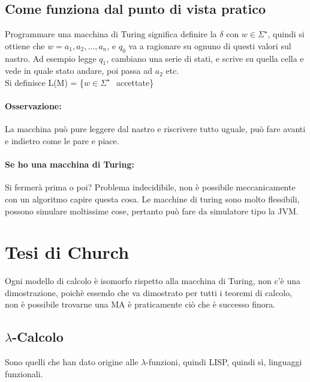 \documentclass[12pt, a4paper, openany, oneside]{book}
\begin{document}
\subsection{Come funziona dal punto di vista pratico}
Programmare una macchina di Turing significa definire la $\delta$ con 
$w \in \Sigma^{\star}$, quindi si ottiene che $w = a_{1}, a_{2}, ..., a_{n}$,
e $q_{0}$ va a ragionare su ognuno di questi valori sul nastro. Ad esempio legge
$q_{1}$, cambiano una serie di stati, e scrive su quella cella e vede in quale
stato andare, poi passa ad $a_{2}$ etc.\\
Si definisce L(M) = \{$w \in \Sigma^{\star} ~$ accettate\}
\paragraph{Osservazione: }La macchina può pure leggere dal nastro e riscrivere
tutto uguale, può fare avanti e indietro come le pare e piace. 
\paragraph{Se ho una macchina di Turing: }Si fermerà prima o poi? Problema 
indecidibile, non è possibile meccanicamente con un algoritmo capire questa cosa.
Le macchine di turing sono molto flessibili, possono simulare moltissime cose, 
pertanto può fare da simulatore tipo la JVM.
\section{Tesi di Church}
Ogni modello di calcolo è isomorfo rispetto alla macchina di Turing, non c'è
una dimostrazione, poichè essendo che va dimostrato per tutti i teoremi di 
calcolo, non è possibile trovarne una MA è praticamente ciò che è successo 
finora.
\subsection{$\lambda$-Calcolo}
Sono quelli che han dato origine alle $\lambda$-funzioni, quindi LISP, quindi
sì, linguaggi funzionali.
\end{document}
